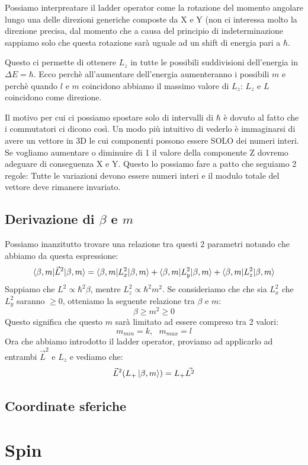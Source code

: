 \noindent Possiamo interpreatare il ladder operator come la rotazione del momento angolare lungo una delle direzioni generiche composte da X e Y (non ci interessa molto la direzione precisa, dal momento che a causa del principio di indeterminazione sappiamo solo che questa rotazione sarà uguale ad un shift di energia pari a $\hbar$.

Questo ci permette di ottenere $L_z$ in tutte le possibili suddivisioni dell'energia in $\Delta E = \hbar$. Ecco perchè all'aumentare dell'energia aumenteranno i possibili $m$ e perchè quando $l$ e $m$ coincidono abbiamo il massimo valore di $L_z$: $L_z$ e $L$ coincidono come direzione.

Il motivo per cui ci possiamo spostare solo di intervalli di $\hbar$ è dovuto al fatto che i commutatori ci dicono così. Un modo più intuitivo di vederlo è immaginarsi di avere un vettore in 3D le cui componenti possono essere SOLO dei numeri interi. Se vogliamo aumentare o diminuire di 1 il valore della componente Z dovremo adeguare di conseguenza X e Y. Questo lo possiamo fare a patto che seguiamo 2 regole: Tutte le variazioni devono essere numeri interi e il modulo totale del vettore deve rimanere invariato.

\subsection{Derivazione di $\beta$ e $m$}
Possiamo inanzitutto trovare una relazione tra questi 2 parametri notando che abbiamo da questa espressione:
$$\braket{\beta, m | \vec{L}^2 | \beta, m} = \braket{\beta, m | L_x^2 | \beta, m} + \braket{\beta, m | L_y^2 | \beta, m} + \braket{\beta, m | L_z^2 | \beta, m} $$
Sappiamo che $L^2 \propto \hbar^2 \beta$, mentre $L_z^2 \propto \hbar^2 m^2$. Se consideriamo che che sia $L^2_x$ che $L^2_y$ saranno $\geq 0$, otteniamo la seguente relazione tra $\beta$ e $m$:
$$\beta \geq m^2 \geq 0$$
Questo significa che questo $m$ sarà limitato ad essere compreso tra 2 valori:
$$m_{min} = k, \text{ } m_{max} = l$$
Ora che abbiamo introdotto il ladder operator, proviamo ad applicarlo ad entrambi $\vec{L}^2$ e $L_z$ e vediamo che:
$$\vec{L}^2 (L_+\ket{\beta, m}) = L_+\vec{L^2}$$

\subsection{Coordinate sferiche}

\section{Spin}

